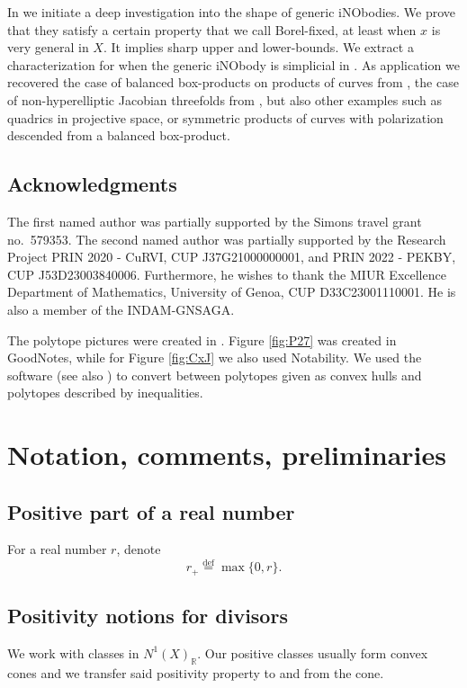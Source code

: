 \documentclass[12pt]{amsart}
\theoremstyle{definition}
\newcommand{\bb}{\ensuremath{\mathfrak{b}}}
\newcommand{\deq}{\ensuremath{\stackrel{\textrm{def}}{=}}}
\newcommand{\?}{ \circled{{\large\bf ?}}}
\let\bb\mathbb
\begin{document}
In \cite{FLgeneralities} we initiate a deep investigation into the shape of generic iNObodies. We prove that they satisfy a certain property that we call Borel-fixed, at least when $x$ is very general in $X$. It implies sharp upper and lower-bounds. We extract a characterization for when the generic iNObody is simplicial in \cite{FLgeneralities}. As application we recovered the case of balanced box-products on products of curves from \cite{FLproductcurves}, the case of non-hyperelliptic Jacobian threefolds from \cite{FLjac}, but also other examples such as quadrics in projective space, or symmetric products of curves with polarization descended from a balanced box-product.

\subsection*{Acknowledgments} The first named author was partially supported by the Simons travel grant no.~579353.  The second named author was partially supported by the Research Project PRIN 2020 - CuRVI, CUP J37G21000000001, and PRIN 2022 - PEKBY, CUP J53D23003840006. Furthermore, he wishes to thank the MIUR Excellence Department of Mathematics, University of Genoa, CUP D33C23001110001. He is also a member of the INDAM-GNSAGA. 

The polytope pictures were created in \cite{Mathematica}. Figure \ref{fig:P27} was created in GoodNotes, while for Figure \ref{fig:CxJ} we also used Notability. We used the \cite{Polymake} software (see also \cite{GJ97}) to convert between polytopes given as convex hulls and polytopes described by inequalities.


\section{Notation, comments, preliminaries}

\subsection{Positive part of a real number}\label{subsec:r+}
For a real number $r$, denote
\[r_+\deq\max\{0,r\}.\]

\subsection{Positivity notions for divisors}
We work with classes in $N^1(X)_{\bb R}$. Our positive classes usually form convex cones and we transfer said positivity property to and from the cone.
\end{document}
